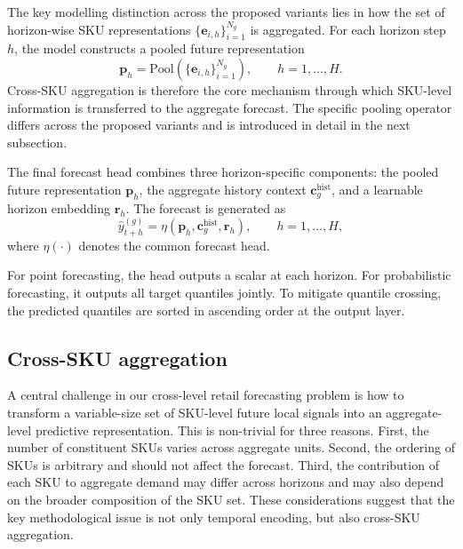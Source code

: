 \documentclass[12pt]{article}
\begin{document}
The key modelling distinction across the proposed variants lies in how the set of horizon-wise SKU representations $\{\mathbf{e}_{i,h}\}_{i=1}^{N_g}$ is aggregated. For each horizon step $h$, the model constructs a pooled future representation
\begin{equation}
  \mathbf{p}_h
  =
  \mathrm{Pool}
  \left(
  \{\mathbf{e}_{i,h}\}_{i=1}^{N_g}
  \right),
  \qquad
  h=1,\ldots,H.
\end{equation}
Cross-SKU aggregation is therefore the core mechanism through which SKU-level information is transferred to the aggregate forecast. The specific pooling operator differs across the proposed variants and is introduced in detail in the next subsection.

The final forecast head combines three horizon-specific components: the pooled future representation $\mathbf{p}_h$, the aggregate history context $\mathbf{c}^{\mathrm{hist}}_g$, and a learnable horizon embedding $\mathbf{r}_h$. The forecast is generated as
\begin{equation}
  \hat{y}^{(g)}_{t+h}
  =
  \eta
  \left(
  \mathbf{p}_h,
  \mathbf{c}^{\mathrm{hist}}_g,
  \mathbf{r}_h
  \right),
  \qquad
  h=1,\ldots,H,
\end{equation}
where $\eta(\cdot)$ denotes the common forecast head.

For point forecasting, the head outputs a scalar at each horizon. For probabilistic forecasting, it outputs all target quantiles jointly. To mitigate quantile crossing, the predicted quantiles are sorted in ascending order at the output layer.

\subsection{Cross-SKU aggregation}

A central challenge in our cross-level retail forecasting problem is how to transform a variable-size set of SKU-level future local signals into an aggregate-level predictive representation. This is non-trivial for three reasons. First, the number of constituent SKUs varies across aggregate units. Second, the ordering of SKUs is arbitrary and should not affect the forecast. Third, the contribution of each SKU to aggregate demand may differ across horizons and may also depend on the broader composition of the SKU set. These considerations suggest that the key methodological issue is not only temporal encoding, but also cross-SKU aggregation.
\end{document}
